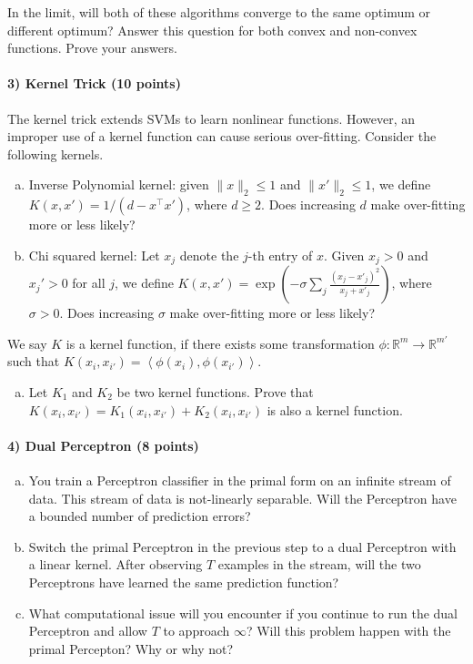 \documentclass[11pt]{article}
\begin{document}
In the limit, will both of these algorithms converge to the same optimum or different optimum? Answer this question for both convex and non-convex functions. Prove your answers.

\paragraph{3) Kernel Trick (10 points)}
The kernel trick extends SVMs to learn nonlinear functions. However, an improper use of a kernel function can cause serious over-fitting. Consider the following kernels.
\begin{enumerate}[(a)]
\item Inverse Polynomial kernel: given $\|x\|_2\leq 1$ and $\|x'\|_2\leq 1$, we define $K(x, x') = 1/(d-x^\top x')$, where $d\geq 2$. Does increasing $d$ make over-fitting more or less likely?

\item Chi squared kernel: Let $x_j$ denote the $j$-th entry of $x$. Given $x_j>0$ and $x_j'>0$ for all $j$, we define $K(x, x') = \exp\left(-\sigma\sum_j\frac{(x_j-x'_j)^2}{x_j+x'_j}\right)$, where $\sigma>0$. Does increasing $\sigma$ make over-fitting more or less likely?

\end{enumerate}
We say $K$ is a kernel function, if there exists some transformation $\phi:\mathbb{R}^m\rightarrow \mathbb{R}^{m'}$ such that $K(x_i,x_{i'}) = \left<\phi(x_i),\phi(x_{i'})\right>$.
\begin{enumerate}[(c)]
\item Let $K_1$ and $K_2$ be two kernel functions. Prove that $K(x_i,x_{i'}) = K_1(x_i,x_{i'}) + K_2(x_i,x_{i'})$ is also a kernel function.
\end{enumerate}

\paragraph{4) Dual Perceptron (8 points)} 
\begin{enumerate}[(c)]
\item You train a Perceptron classifier in the primal form on an infinite stream of data. This stream of data is not-linearly separable. Will the Perceptron have a bounded number of prediction errors?
\item Switch the primal Perceptron in the previous step to a dual Perceptron with a linear kernel. After observing $T$ examples in the stream, will the two Perceptrons have learned the same prediction function?
\item What computational issue will you encounter if you continue to run the dual Perceptron and allow $T$ to approach $\infty$? Will this problem happen with the primal Percepton? Why or why not?
\end{enumerate}
\end{document}
